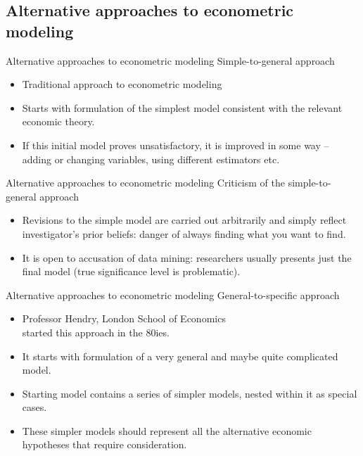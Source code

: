 \documentclass[usenames,dvipsnames]{beamer}
\begin{document}
\subsection{Alternative approaches to econometric modeling}
\begin{frame}{Alternative approaches to econometric modeling}
Simple-to-general approach\\
\vspace{0.3cm}
\begin{itemize}
\item Traditional approach to econometric modeling
\vspace{0.3cm}
\item Starts with formulation of the simplest model consistent with the relevant economic theory.
\vspace{0.3cm}
\item If this initial model proves unsatisfactory, it is improved in some way – adding or changing variables, using different estimators etc.
\end{itemize}
\end{frame}
\begin{frame}{Alternative approaches to econometric modeling}
 Criticism  of the simple-to-general approach\\
\begin{itemize}
\vspace{0.3cm}
\item Revisions to the simple model are carried out arbitrarily and simply reflect investigator's prior beliefs: danger of always finding what you want to find.
\vspace{0.3cm}
\item It is open to accusation of data mining: researchers usually presents just the final model (true significance level is problematic).
\end{itemize}
\end{frame}
\begin{frame}{Alternative approaches to econometric modeling}
General-to-specific approach\\
\medskip
\begin{itemize}
\item Professor Hendry, London School of Economics \\started this approach in the 80ies.
\medskip
\item It starts with formulation of a very general and maybe quite complicated model.
\medskip
\item Starting model contains a series of simpler models, nested within it as special cases. 
\medskip
\item These simpler models should represent all the alternative economic hypotheses that require consideration.
\end{itemize}
\end{frame}
\end{document}
